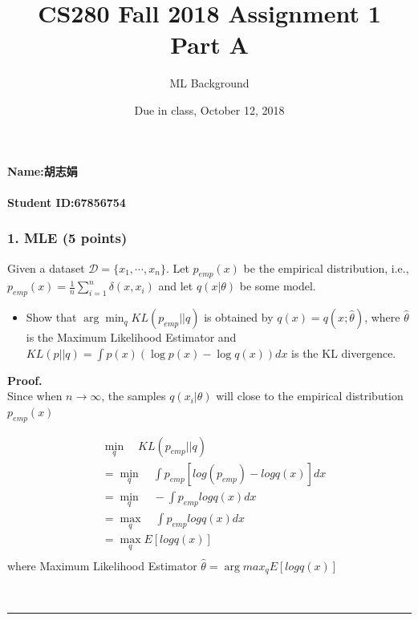 \documentclass[12pt]{article}%
\newenvironment{proof}[1][Proof]{\textbf{#1.} }{\ \rule{0.5em}{0.5em}}
\begin{document}
\title{CS280 Fall 2018 Assignment 1 \\ Part A}
\author{ML Background}
\date{Due in class, October 12, 2018}
\maketitle

\paragraph{Name:胡志娟}

\paragraph{Student ID:67856754}

\newpage


\subsubsection*{1. MLE (5 points)}
Given a dataset $\mathcal{D} = \{x_1,\cdots, x_n\}$. Let $p_{emp}(x)$ be the empirical distribution, i.e., $p_{emp}(x)=\frac{1}{n}\sum_{i=1}^n\delta(x,x_i) $ and let $q(x|\theta)$ be some model.  
\begin{itemize}
	\item Show that $\arg\min_q KL(p_{emp}||q)$ is obtained by $q(x)=q(x;\hat{\theta})$, where $\hat{\theta}$ is the Maximum Likelihood Estimator and $KL(p||q)=\int p(x)(\log p(x)- \log q(x))dx$ is the KL divergence.
\end{itemize}

\begin{proof}\\
	Since when $n \rightarrow \infty$, the samples $q(x_i|\theta)$ will close to the empirical distribution $p_{emp}(x)$
	
	 \begin{align*}
	 &\min_q \quad KL(p_{emp}||q) \\
	 &= \min_q \quad \int p_{emp} [log(p_{emp}) - logq(x)] dx \\
	 &= \min_q \quad -\int p_{emp}logq(x)dx \\
	 &= \max_q \quad \int p_{emp}logq(x)dx \\
	 &= \max_q E[logq(x)] \\
	 \end{align*}
	 where Maximum Likelihood Estimator $\hat{\theta}=\arg max_q E[logq(x)] $ 
	 
	 
	 
\end{proof}
\end{document}
